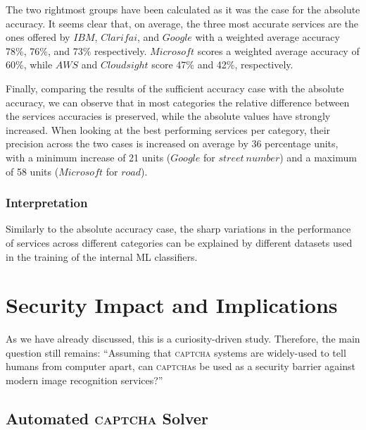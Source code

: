 \documentclass[sigconf,review,anonymous]{acmart}
\newcommand{\captcha}{\textsc{captcha}\xspace}
\newcommand{\captchas}{\textsc{captcha}s\xspace}
\begin{document}
The two rightmost groups have been calculated as it was the case for the absolute accuracy. It seems clear that, on average, the three most accurate services are the ones offered by $IBM$, $Clarifai$, and $Google$ with a weighted average accuracy 78\%, 76\%, and 73\% respectively.
$Microsoft$ scores a weighted average accuracy of 60\%, while $AWS$ and $Cloudsight$ score 47\% and 42\%, respectively. 

Finally, comparing the results of the sufficient accuracy case with the absolute accuracy, we can observe that in most categories the relative difference between the services accuracies is preserved, while the absolute values have strongly increased. When looking at the best performing services per category, their precision across the two cases is increased on average by 36 percentage units, with a minimum increase of 21 units ($Google$ for $street~number$) and a maximum of 58 units ($Microsoft$ for $road$).  

\subsubsection*{Interpretation}
Similarly to the absolute accuracy case, the sharp variations in the performance of services across different categories can be explained by different datasets used in the training of the internal ML classifiers.



\section{Security Impact and Implications}
\label{sec:ImpactImplications}

As we have already discussed, this is a curiosity-driven study. Therefore, the main question still remains: ``Assuming that \captcha systems are widely-used to tell humans from computer apart, can \captchas be used as a security barrier against modern image recognition services?''

\subsection{Automated \captcha Solver}
\end{document}
